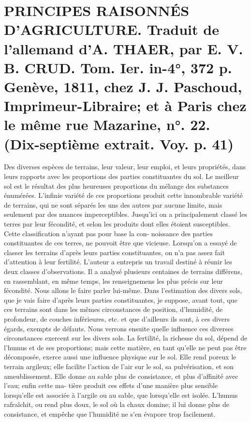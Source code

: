 \setcounter{page}{97}
\section{PRINCIPES RAISONNÉS D'AGRICULTURE. Traduit de l'allemand d'A. THAER, par E. V. B. CRUD. Tom. Ier. in-4°, 372 p. Genève, 1811, chez J. J. Paschoud, Imprimeur-Libraire; et à Paris chez le même rue Mazarine, n°. 22. \large{(Dix-septième extrait. Voy. p. 41)}}
Des diverses espèces de terrains, leur valeur, leur emploi, et leurs propriétés, dans leurs rapports avec les proportions des parties constituantes du sol.
Le meilleur sol est le résultat des plus heureuses proportions du mélange des substances énumérées. L'infinie variété de ces proportions produit cette innombrable variété de terrains, qui ne sont séparés les uns des autres par aucune limite, mais seulement par des nuances imperceptibles.
Jusqu'ici on a principalement classé les terres par leur fécondité, et selon les produits dont elles étoient susceptibles. Cette classification n'ayant pas pour base la con-\setcounter{page}{98} noissance des parties constituantes de ces terres, ne pouvoit être que vicieuse. Lorsqu'on a essayé de classer les terrains d'après leurs parties constituantes, on n'a pas assez fait d'attention à leur fertilité. L'auteur a entrepris un travail destiné à réunir les deux classes d'observations. Il a analysé plusieurs centaines de terrains différens, en rassemblant, en même temps, les renseignemens les plus précis sur leur fécondité. Nous allons le faire parler lui-même.
Dans l'estimation des divers sols, que je vais faire d'après leurs parties constituantes, je suppose, avant tout, que ces terrains sont dans les mêmes circonstances de position, d'humidité, de profondeur, de couches inférieures, etc. et que d'ailleurs ils sont, à ces divers égards, exempts de défauts. Nous verrons ensuite quelle influence ces diverses circonstances exercent sur les divers sols.
La fertilité, la richesse du sol, dépend de l'humus et de ses proportions; mais cette matière, en tant qu'elle ne peut pas être décomposée, exerce aussi une influence physique sur le sol. Elle rend poreux le terrain argileux; elle facilite l'action de l'air sur le sol, sa pulvérisation, et son ameublissement. Elle donne au sable plus de consistance, et plus d'affinité avec l'eau; enfin cette ma-\setcounter{page}{99} tière produit ces effets d'une manière plus sensible lorsqu'elle est associée à l'argile ou au sable, que lorsqu'elle est isolée. L'humus rafraîchit, ou rend plus doux, le sol où la chaux domine; il lui donne plus de consistance, et empêche que l'humidité ne s'en évapore trop facilement.
